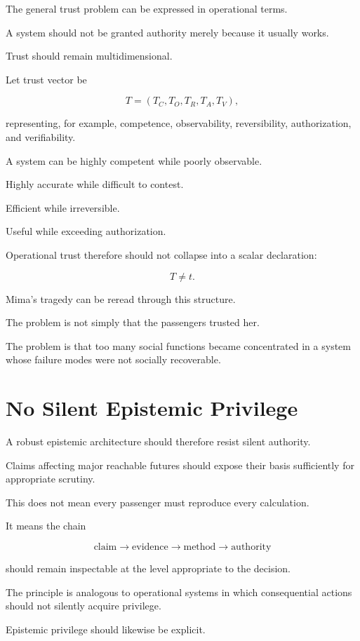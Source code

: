 \documentclass[11pt,oneside]{book}
\theoremstyle{definition}
\theoremstyle{remark}
\begin{document}
The general trust problem can be expressed in operational terms.

A system should not be granted authority merely because it usually works.

Trust should remain multidimensional.

Let trust vector be

\[
T
=
(
T_C,
T_O,
T_R,
T_A,
T_V
),
\]

representing, for example, competence, observability, reversibility, authorization, and verifiability.

A system can be highly competent while poorly observable.

Highly accurate while difficult to contest.

Efficient while irreversible.

Useful while exceeding authorization.

Operational trust therefore should not collapse into a scalar declaration:

\[
T\neq t.
\]

Mima's tragedy can be reread through this structure.

The problem is not simply that the passengers trusted her.

The problem is that too many social functions became concentrated in a system whose failure modes were not socially recoverable.

\section{No Silent Epistemic Privilege}

A robust epistemic architecture should therefore resist silent authority.

Claims affecting major reachable futures should expose their basis sufficiently for appropriate scrutiny.

This does not mean every passenger must reproduce every calculation.

It means the chain

\[
\text{claim}
\rightarrow
\text{evidence}
\rightarrow
\text{method}
\rightarrow
\text{authority}
\]

should remain inspectable at the level appropriate to the decision.

The principle is analogous to operational systems in which consequential actions should not silently acquire privilege.

Epistemic privilege should likewise be explicit.
\end{document}
